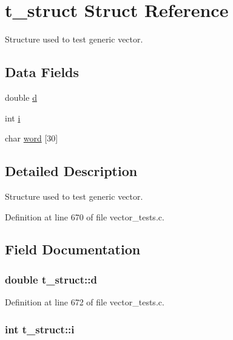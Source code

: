 \hypertarget{structt__struct}{\section{t\-\_\-struct \-Struct \-Reference}
\label{structt__struct}
}


\-Structure used to test generic vector.  


\subsection*{\-Data \-Fields}
\begin{DoxyCompactItemize}
\item 
double \hyperlink{structt__struct_a2029e2f2da88d23bcc9fa6ba45f51bf4}{d}
\item 
int \hyperlink{structt__struct_a488184c86cae0be164cfb634882b8f7a}{i}
\item 
char \hyperlink{structt__struct_ab5b290b572fc4036f1e5efc671098c7f}{word} \mbox{[}30\mbox{]}
\end{DoxyCompactItemize}


\subsection{\-Detailed \-Description}
\-Structure used to test generic vector. 



\-Definition at line 670 of file vector\-\_\-tests.\-c.



\subsection{\-Field \-Documentation}
\hypertarget{structt__struct_a2029e2f2da88d23bcc9fa6ba45f51bf4}{
\subsubsection[{d}]{\setlength{\rightskip}{0pt plus 5cm}double {\bf t\-\_\-struct\-::d}}}\label{structt__struct_a2029e2f2da88d23bcc9fa6ba45f51bf4}


\-Definition at line 672 of file vector\-\_\-tests.\-c.

\hypertarget{structt__struct_a488184c86cae0be164cfb634882b8f7a}{
\subsubsection[{i}]{\setlength{\rightskip}{0pt plus 5cm}int {\bf t\-\_\-struct\-::i}}}\label{structt__struct_a488184c86cae0be164cfb634882b8f7a}


